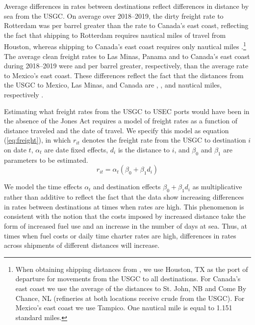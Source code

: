 \documentclass[12pt]{article}
\begin{document}
Average differences in rates between destinations reflect differences in distance by sea from the USGC. On average over 2018--2019, the dirty freight rate to Rotterdam was per barrel greater than the rate to Canada's east coast, reflecting the fact that shipping to Rotterdam requires nautical miles of travel from Houston, whereas shipping to Canada's east coast requires only nautical miles \citep{Searoutes2023}.\footnote{When obtaining shipping distances from \cite{Searoutes2023}, we use Houston, TX as the port of departure for movements from the USGC to all destinations. For Canada's east coast we use the average of the distances to St. John, NB and Come By Chance, NL (refineries at both locations receive crude from the USGC). For Mexico's east coast we use Tampico. One nautical mile is equal to 1.151 standard miles.} The average clean freight rates to Las Minas, Panama and to Canada's east coast during 2018--2019 were and per barrel greater, respectively, than the average rate to Mexico's east coast. These differences reflect the fact that the distances from the USGC to Mexico, Las Minas, and Canada are  \unskip, \unskip, and nautical miles, respectively \citep{Searoutes2023}.

Estimating what freight rates from the USGC to USEC ports would have been in the absence of the Jones Act requires a model of freight rates as a function of distance traveled and the date of travel. We specify this model as equation (\ref{eq:freight}), in which $r_{it}$ denotes the freight rate from the USGC to destination $i$ on date $t$, $\alpha_t$ are date fixed effects, $d_i$ is the distance to $i$, and $\beta_0$ and $\beta_1$ are parameters to be estimated.
\begin{equation}
r_{it} = \alpha_t(\beta_0 + \beta_1d_i) \label{eq:freight}
\end{equation}

We model the time effects $\alpha_t$ and destination effects $\beta_0 + \beta_1d_i$ as multiplicative rather than additive to reflect the fact that the data show increasing differences in rates between destinations at times when rates are high. This phenomenon is consistent with the notion that the costs imposed by increased distance take the form of increased fuel use and an increase in the number of days at sea. Thus, at times when fuel costs or daily time charter rates are high, differences in rates across shipments of different distances will increase.
\end{document}
